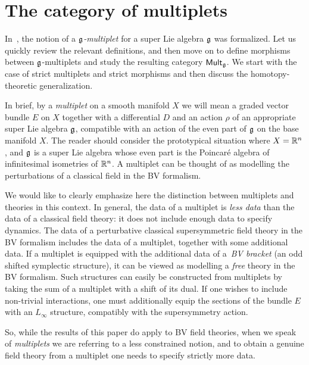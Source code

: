 \documentclass[11pt]{article}
\numberwithin{equation}{section}
\numberwithin{equation}{section}
\def\cat#1{\ensuremath{\mathsf{#1}}}
\DeclareMathOperator{\Mult}{\cat{Mult}}
\begin{document}
\section{The category of multiplets} \label{sec: multiplets}
In~\cite{perspectives}, the notion of a \emph{$\mathfrak g$-multiplet} for a super Lie algebra $\mathfrak g$ was formalized. Let us quickly review the relevant definitions, and then move on to define morphisms between $\mathfrak g$-multiplets and study the resulting category $\Mult_{\fg}$. We start with the case of strict multiplets and strict morphisms and then discuss the homotopy-theoretic generalization.

In brief, by a \emph{multiplet} on a smooth manifold $X$ we will mean a graded vector bundle $E$ on $X$ together with a differential $D$ and an action $\rho$ of an appropriate super Lie algebra $\mathfrak g$, compatible with an action of the even part of $\mathfrak g$ on the base manifold $X$. The reader should consider the prototypical situation where $X = \mathbb R^n$, and $\mathfrak g$ is a super Lie algebra whose even part is the Poincar\'e algebra of infinitesimal isometries of $\mathbb R^n$. A multiplet can be thought of as modelling the perturbations of a classical field in the BV formalism.

\begin{rmk}
	We would like to clearly emphasize here the distinction between multiplets and theories in this context. In general, the data of a multiplet is \emph{less data} than the data of a classical field theory: it does not include enough data to specify dynamics. The data of a perturbative classical supersymmetric field theory in the BV formalism includes the data of a multiplet, together with some additional data. If a multiplet is equipped with the additional data of a~\emph{BV bracket} (an odd shifted symplectic structure), it can be viewed as modelling a \emph{free} theory in the BV formalism. Such structures can easily be constructed from multiplets by taking the sum of a multiplet with a shift of its dual.	If one wishes to include non-trivial interactions, one must additionally equip the sections of the bundle $E$ with an $L_\infty$ structure, compatibly with the supersymmetry action.
	
	So, while the results of this paper do apply to BV field theories, when we speak of \emph{multiplets} we are referring to a less constrained notion, and to obtain a genuine field theory from a multiplet one needs to specify strictly more data.
\end{rmk}
\end{document}
